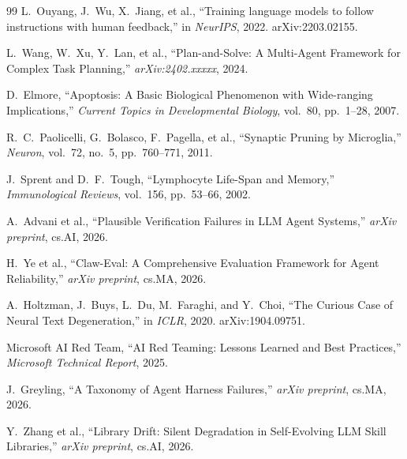 \documentclass[11pt,a4paper]{article}
\begin{document}
\begin{thebibliography}{99}
L.~Ouyang, J.~Wu, X.~Jiang, et al.,
``Training language models to follow instructions with human feedback,''
in \textit{NeurIPS}, 2022. arXiv:2203.02155.

L.~Wang, W.~Xu, Y.~Lan, et al.,
``Plan-and-Solve: A Multi-Agent Framework for Complex Task Planning,''
\textit{arXiv:2402.xxxxx}, 2024.

D.~Elmore,
``Apoptosis: A Basic Biological Phenomenon with Wide-ranging Implications,''
\textit{Current Topics in Developmental Biology}, vol.~80, pp.~1--28, 2007.

R.~C.~Paolicelli, G.~Bolasco, F.~Pagella, et al.,
``Synaptic Pruning by Microglia,''
\textit{Neuron}, vol.~72, no.~5, pp.~760--771, 2011.

J.~Sprent and D.~F.~Tough,
``Lymphocyte Life-Span and Memory,''
\textit{Immunological Reviews}, vol.~156, pp.~53--66, 2002.

A.~Advani et al.,
``Plausible Verification Failures in LLM Agent Systems,''
\textit{arXiv preprint}, cs.AI, 2026.

H.~Ye et al.,
``Claw-Eval: A Comprehensive Evaluation Framework for Agent Reliability,''
\textit{arXiv preprint}, cs.MA, 2026.

A.~Holtzman, J.~Buys, L.~Du, M.~Faraghi, and Y.~Choi,
``The Curious Case of Neural Text Degeneration,''
in \textit{ICLR}, 2020. arXiv:1904.09751.

Microsoft AI Red Team,
``AI Red Teaming: Lessons Learned and Best Practices,''
\textit{Microsoft Technical Report}, 2025.

J.~Greyling,
``A Taxonomy of Agent Harness Failures,''
\textit{arXiv preprint}, cs.MA, 2026.

Y.~Zhang et al.,
``Library Drift: Silent Degradation in Self-Evolving LLM Skill Libraries,''
\textit{arXiv preprint}, cs.AI, 2026.

\end{thebibliography}
\end{document}
